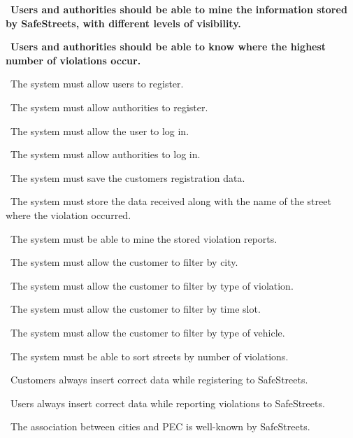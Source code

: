 \begin{description}
			\item {}\ \textbf{Users and authorities should be able to mine the information stored by SafeStreets, with different levels of visibility.}
				\begin{description}
					\setlength\itemsep{0.7cm}
					\item {}\ \textbf{Users and authorities should be able to know where the highest number of violations occur.}
						\begin{description}
							\item {}\ The system must allow users to register.
							\item {}\ The system must allow authorities to register.
							\item {}\ The system must allow the user to log in.
							\item {}\ The system must allow authorities to log in.
							\item {}\ The system must save the customers registration data.
							\item {}\ The system must store the data received along with the name of the street where the violation occurred.
							\item {}\ The system must be able to mine the stored violation reports.
							\item {}\ The system must allow the customer to filter by city.
							\item {}\ The system must allow the customer to filter by type of violation.
							\item {}\ The system must allow the customer to filter by time slot.
							\item {}\ The system must allow the customer to filter by type of vehicle.
							\item {}\ The system must be able to sort streets by number of violations.
							\item {}\ Customers always insert correct data while registering to SafeStreets.
							\item {}\ Users always insert correct data while reporting violations to SafeStreets.
							\item {}\ The association between cities and PEC is well-known by SafeStreets.

\end{description}
\end{description}
\end{description}
